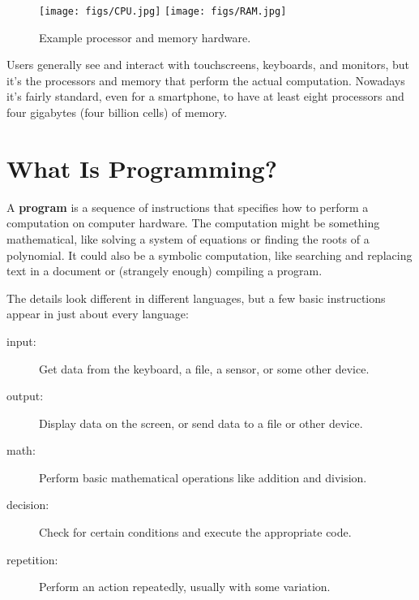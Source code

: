 \begin{figure}[!ht]
\begin{center}
\texttt{[image: figs/CPU.jpg]}
\hspace{2em}
\texttt{[image: figs/RAM.jpg]}
\caption{Example processor and memory hardware.}
\label{fig.cpuram}
\end{center}
\end{figure}

Users generally see and interact with touchscreens, keyboards, and monitors, but it's the processors and memory that perform the actual computation.
Nowadays it's fairly standard, even for a smartphone, to have at least eight processors and four gigabytes (four billion cells) of memory.


\section{What Is Programming?}


A {\bf program} is a sequence of instructions that specifies how to perform a computation on computer hardware.
The computation might be something mathematical, like solving a system of equations or finding the roots of a polynomial.
It could also be a symbolic computation, like searching and replacing text in a document or (strangely enough) compiling a program.

The details look different in different languages, but a few basic instructions appear in just about every language:

\begin{description}
\item[input:] Get data from the keyboard, a file, a sensor, or some other device.
\item[output:] Display data on the screen, or send data to a file or other device.
\item[math:] Perform basic mathematical operations like addition and division.
\item[decision:] Check for certain conditions and execute the appropriate code.
\item[repetition:] Perform an action repeatedly, usually with some variation.
\end{description}


